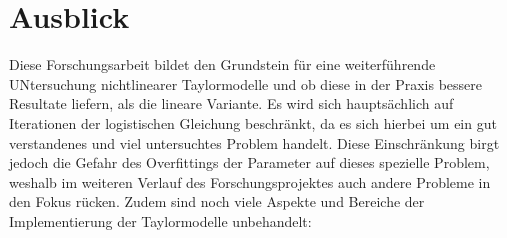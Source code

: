 
\chapter{Ausblick}
\label{ch:fazit}
Diese Forschungsarbeit bildet den Grundstein für eine weiterführende UNtersuchung nichtlinearer Taylormodelle und ob diese in der Praxis bessere Resultate liefern, als die lineare Variante. Es wird sich hauptsächlich auf Iterationen der logistischen Gleichung beschränkt, da es sich hierbei um ein gut verstandenes und viel untersuchtes Problem handelt. Diese Einschränkung birgt jedoch die Gefahr des Overfittings der Parameter auf dieses spezielle Problem, weshalb im weiteren Verlauf des Forschungsprojektes auch andere Probleme in den Fokus rücken. Zudem sind noch viele Aspekte und Bereiche der Implementierung der Taylormodelle unbehandelt:

